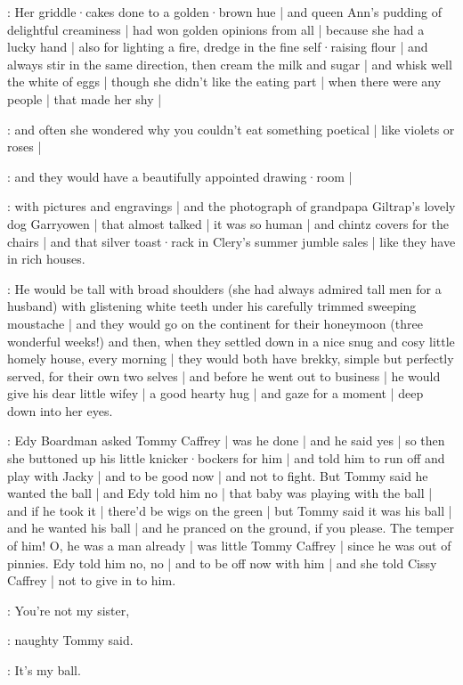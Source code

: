 \gertyReal:
Her griddle·cakes done to a golden·brown hue |
and queen Ann's pudding of delightful creaminess |
had won golden opinions from all |
because she had a lucky hand |
also for lighting a fire,
dredge in the fine self·raising flour |
and always stir in the same direction,
then cream the milk and sugar |
and whisk well the white of eggs |
though she didn't like the eating part |
when there were any people |
that made her shy |

\gertyNovel:
and often
she wondered why you couldn't eat something poetical |
like violets or roses |

\gertyRomantic:
and they would have a beautifully appointed drawing·room |

\gertyReal:
with pictures and engravings |
and the photograph of grandpapa Giltrap's lovely dog Garryowen |
that almost talked |
it was so human |
and chintz covers for the chairs |
and that silver toast·rack in Clery's summer jumble sales |
like they have in rich houses.

\gertyNovel:
He would be tall with broad shoulders
(she had always admired tall men for a husband)
with glistening white teeth
under his carefully trimmed sweeping moustache |
and they would go on the continent
for their honeymoon
(three wonderful weeks!)
and then,
when they settled down in a nice snug and cosy little homely house,
every morning |
they would both have brekky,%
simple but perfectly served,
for their own two selves |
and before he went out to business |
he would give his dear little wifey |
a good hearty hug |
and gaze for a moment |
deep down into her eyes.

:
Edy Boardman asked Tommy Caffrey |
was he done |
and he said yes |
so then she buttoned up his little knicker·bockers for him |
and told him to run off
and play with Jacky |
and to be good now |
and not to fight.
But Tommy said he wanted the ball |
and Edy told him no |
that baby was playing with the ball |
and if he took it |
there'd be wigs on the green |
but Tommy said it was his ball |
and he wanted his ball |
and he pranced on the ground,
if you please.
The temper of him!
O, he was a man already |
was little Tommy Caffrey |
since he was out of pinnies.%
Edy told him no, no |
and to be off now with him |
and she told Cissy Caffrey |
not to give in to him.

\tommy:
You're not my sister,

:
naughty Tommy said.

\tommy:
It's my ball.

